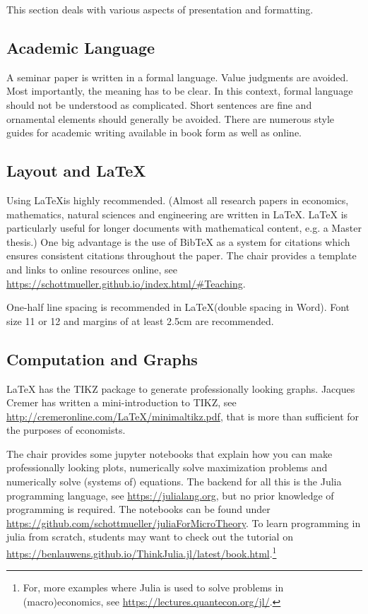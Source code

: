 \documentclass[a4paper,11pt]{article}
\begin{document}
This section deals with various aspects of presentation and formatting.

\subsection{Academic Language}
\label{sec:academic-language}

A seminar paper is written in a formal language. Value judgments are avoided. Most importantly, the meaning has to be clear. In this context, formal language should not be understood as complicated. Short sentences are fine and ornamental elements should generally be avoided.
There are numerous style guides for academic writing available in book form as well as online.

\subsection{Layout and \LaTeX}
\label{sec:layout}

Using \LaTeX is highly recommended. (Almost all research papers in economics, mathematics, natural sciences and engineering are written in \LaTeX. \LaTeX { }is particularly useful for longer documents with mathematical content, e.g. a Master thesis.) One big advantage is the use of BibTeX as a system for citations which ensures consistent citations throughout the paper. The chair provides a template and links to online resources online, see \url{https://schottmueller.github.io/index.html/#Teaching}. 

One-half line spacing is recommended in \LaTeX (double spacing in Word). Font size 11 or 12 and margins of at least 2.5cm are recommended.

\subsection{Computation and Graphs}
\label{sec:computation-graphs}

\LaTeX{ }has the TIKZ package to generate professionally looking graphs. Jacques Cremer has written a mini-introduction to TIKZ, see \url{http://cremeronline.com/LaTeX/minimaltikz.pdf}, that is more than sufficient for the purposes of economists.

The chair provides some jupyter notebooks that explain how you can make professionally looking plots, numerically solve maximization problems and numerically solve (systems of) equations. The backend for all this is the Julia programming language, see \url{https://julialang.org}, but no prior knowledge of programming is required. The notebooks can be found under \url{https://github.com/schottmueller/juliaForMicroTheory}. To learn programming in julia from scratch, students may want to check out the tutorial on  \url{https://benlauwens.github.io/ThinkJulia.jl/latest/book.html}.\footnote{For, more examples where Julia is used to solve problems in (macro)economics, see \url{https://lectures.quantecon.org/jl/}.}
\end{document}
